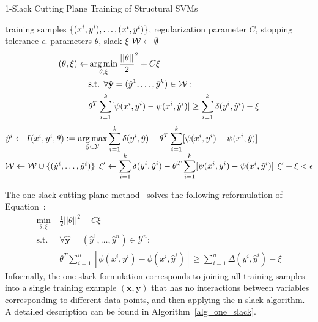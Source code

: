 \begin{algorithm*}[t]
    \caption{1-Slack Cutting Plane Training of Structural SVMs \label{alg_one_slack}}
    \begin{algorithmic}[1]
        \Require training samples $\{ (x^{i}, y^{i}), \dots, (x^{i}, y^{i})\}$, regularization parameter $C$, stopping tolerance $\epsilon$.
        \Ensure parameters $\theta$, slack $\xi$
        \State $\mathcal{W} \leftarrow \emptyset$
        \Repeat
            \State 
            \vspace{-5mm}
            \begin{align*}
            (\theta, \xi) \leftarrow \displaystyle &\operatorname*{arg\,min}_{\theta, \xi} \frac{||\theta||}{2}^2 + C \xi\\
            &\text{s.t. }\forall \hat{\mathbf{y}}=(\hat{y}^{1}, \dots, \hat{y}^{k}) \in \mathcal{W}:\\
            &\theta^T \sum_{i=1}^k [\psi(x^{i}, y^{i}) - \psi(x^{i}, \hat{y}^{i})] \geq \sum_{i=1}^k \delta(y^{i}, \hat{y}^{i}) - \xi
            \end{align*}
                \State
                $\hat{y}^{i} \leftarrow I(x^{i}, y^{i}, \theta) := \displaystyle \operatorname*{arg\,max}_{\hat{y}\in\mathcal{Y}} \sum_{i=1}^k \delta(y^{i}, \hat{y}) - \theta^T \sum_{i=1}^k [\psi(x^{i}, y^{i}) - \psi(x^{i}, \hat{y})]$ \label{get_cutting_plane}
            \EndFor
            \State $\mathcal{W} \leftarrow \mathcal{W} \cup \{ (\hat{y}^{i}, \dots, \hat{y}^{i}) \} $
            \State $ \displaystyle \xi' \leftarrow  \sum_{i=1}^k \delta(y^{i}, \hat{y}^{i}) - \theta^T \sum_{i=1}^k [\psi(x^{i}, y^{i}) - \psi(x^{i}, \hat{y}^{i})] $
        \Until $\xi' - \xi < \epsilon$ \label{convergence_check}
    \end{algorithmic}
\end{algorithm*}

The one-slack cutting plane method~\citep{joachims2009cutting} solves the
following reformulation of Equation~:
\begin{align}\label{eq:oneslack}
    \min_{\theta, \xi}\ &\frac{1}{2} ||\theta||^2 + C \xi\\
    \text{s.t. }&\forall \hat{\mathbf{y}}=(\hat{y}^1, \dots, \hat{y}^n) \in \mathcal{Y}^n:\\
        &\theta^T \sum_{i=1}^n [\phi(x^i, y^i) - \phi(x^i,
            \hat{y}^i)] \geq \sum_{i=1}^n \Delta(y^i, \hat{y}^i)
            - \xi
\end{align}
Informally, the one-slack formulation corresponds to joining all training
samples into a single training example $(\mathbf{x}, \mathbf{y})$ that has no
interactions between variables corresponding to different data points, and
then applying the n-slack algorithm.
A detailed description can be found in Algorithm~\ref{alg_one_slack}.

